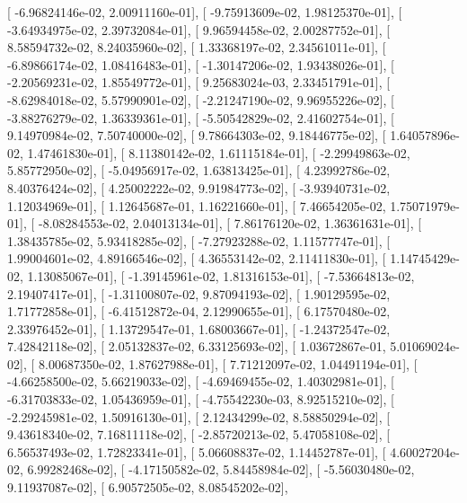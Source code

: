 \documentclass{article}
\begin{document}
       [ -6.96824146e-02,   2.00911160e-01],
       [ -9.75913609e-02,   1.98125370e-01],
       [ -3.64934975e-02,   2.39732084e-01],
       [  9.96594458e-02,   2.00287752e-01],
       [  8.58594732e-02,   8.24035960e-02],
       [  1.33368197e-02,   2.34561011e-01],
       [ -6.89866174e-02,   1.08416483e-01],
       [ -1.30147206e-02,   1.93438026e-01],
       [ -2.20569231e-02,   1.85549772e-01],
       [  9.25683024e-03,   2.33451791e-01],
       [ -8.62984018e-02,   5.57990901e-02],
       [ -2.21247190e-02,   9.96955226e-02],
       [ -3.88276279e-02,   1.36339361e-01],
       [ -5.50542829e-02,   2.41602754e-01],
       [  9.14970984e-02,   7.50740000e-02],
       [  9.78664303e-02,   9.18446775e-02],
       [  1.64057896e-02,   1.47461830e-01],
       [  8.11380142e-02,   1.61115184e-01],
       [ -2.29949863e-02,   5.85772950e-02],
       [ -5.04956917e-02,   1.63813425e-01],
       [  4.23992786e-02,   8.40376424e-02],
       [  4.25002222e-02,   9.91984773e-02],
       [ -3.93940731e-02,   1.12034969e-01],
       [  1.12645687e-01,   1.16221660e-01],
       [  7.46654205e-02,   1.75071979e-01],
       [ -8.08284553e-02,   2.04013134e-01],
       [  7.86176120e-02,   1.36361631e-01],
       [  1.38435785e-02,   5.93418285e-02],
       [ -7.27923288e-02,   1.11577747e-01],
       [  1.99004601e-02,   4.89166546e-02],
       [  4.36553142e-02,   2.11411830e-01],
       [  1.14745429e-02,   1.13085067e-01],
       [ -1.39145961e-02,   1.81316153e-01],
       [ -7.53664813e-02,   2.19407417e-01],
       [ -1.31100807e-02,   9.87094193e-02],
       [  1.90129595e-02,   1.71772858e-01],
       [ -6.41512872e-04,   2.12990655e-01],
       [  6.17570480e-02,   2.33976452e-01],
       [  1.13729547e-01,   1.68003667e-01],
       [ -1.24372547e-02,   7.42842118e-02],
       [  2.05132837e-02,   6.33125693e-02],
       [  1.03672867e-01,   5.01069024e-02],
       [  8.00687350e-02,   1.87627988e-01],
       [  7.71212097e-02,   1.04491194e-01],
       [ -4.66258500e-02,   5.66219033e-02],
       [ -4.69469455e-02,   1.40302981e-01],
       [ -6.31703833e-02,   1.05436959e-01],
       [ -4.75542230e-03,   8.92515210e-02],
       [ -2.29245981e-02,   1.50916130e-01],
       [  2.12434299e-02,   8.58850294e-02],
       [  9.43618340e-02,   7.16811118e-02],
       [ -2.85720213e-02,   5.47058108e-02],
       [  6.56537493e-02,   1.72823341e-01],
       [  5.06608837e-02,   1.14452787e-01],
       [  4.60027204e-02,   6.99282468e-02],
       [ -4.17150582e-02,   5.84458984e-02],
       [ -5.56030480e-02,   9.11937087e-02],
       [  6.90572505e-02,   8.08545202e-02],
\end{document}
